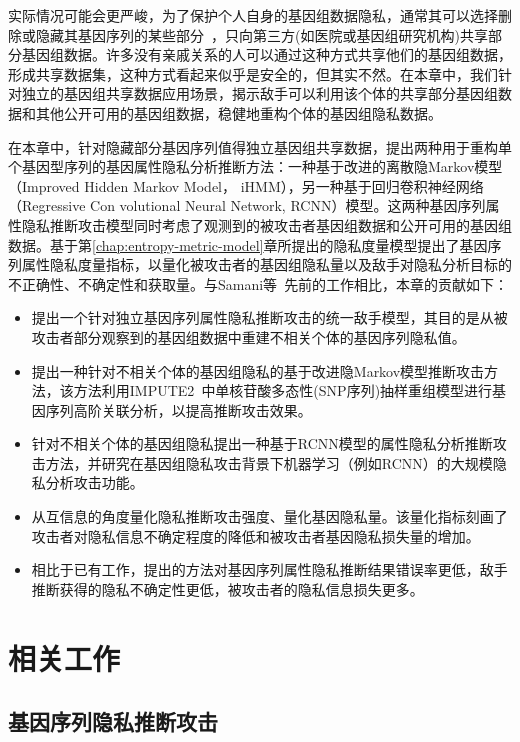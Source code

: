 实际情况可能会更严峻，为了保护个人自身的基因组数据隐私，通常其可以选择删除或隐藏其基因序列的某些部分~\cite{shi2017overview}，只向第三方(如医院或基因组研究机构)共享部分基因组数据。许多没有亲戚关系的人可以通过这种方式共享他们的基因组数据，形成共享数据集，这种方式看起来似乎是安全的，但其实不然。在本章中，我们针对独立的基因组共享数据应用场景，揭示敌手可以利用该个体的共享部分基因组数据和其他公开可用的基因组数据，稳健地重构个体的基因组隐私数据。

在本章中，针对隐藏部分基因序列值得独立基因组共享数据，提出两种用于重构单个基因型序列的基因属性隐私分析推断方法：一种基于改进的离散隐Markov模型（Improved Hidden Markov Model， iHMM），另一种基于回归卷积神经网络（Regressive Con volutional Neural Network, RCNN）模型。这两种基因序列属性隐私推断攻击模型同时考虑了观测到的被攻击者基因组数据和公开可用的基因组数据。基于第\ref{chap:entropy-metric-model}章所提出的隐私度量模型提出了基因序列属性隐私度量指标，以量化被攻击者的基因组隐私量以及敌手对隐私分析目标的不正确性、不确定性和获取量。与Samani等~\cite{samani2015quantifying}先前的工作相比，本章的贡献如下：
\begin{itemize}
	\item 提出一个针对独立基因序列属性隐私推断攻击的统一敌手模型，其目的是从被攻击者部分观察到的基因组数据中重建不相关个体的基因序列隐私值。
	\item 提出一种针对不相关个体的基因组隐私的基于改进隐Markov模型推断攻击方法，该方法利用IMPUTE2~\cite{howie2009flexible}中单核苷酸多态性(SNP序列)抽样重组模型进行基因序列高阶关联分析，以提高推断攻击效果。
	\item 针对不相关个体的基因组隐私提出一种基于RCNN模型的属性隐私分析推断攻击方法，并研究在基因组隐私攻击背景下机器学习（例如RCNN）的大规模隐私分析攻击功能。
	\item 从互信息的角度量化隐私推断攻击强度、量化基因隐私量。该量化指标刻画了攻击者对隐私信息不确定程度的降低和被攻击者基因隐私损失量的增加。
	\item 相比于已有工作，提出的方法对基因序列属性隐私推断结果错误率更低，敌手推断获得的隐私不确定性更低，被攻击者的隐私信息损失更多。
\end{itemize}

\section{相关工作}\label{sec:relat}
\subsection{基因序列隐私推断攻击}

